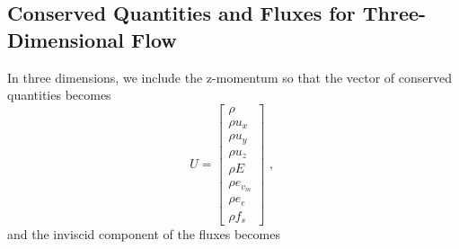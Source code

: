 \subsection{Conserved Quantities and Fluxes for Three-Dimensional Flow}
%
In three dimensions, we include the z-momentum so that the vector of conserved quantities becomes
\begin{equation}
 U = \left [ \begin{array}{c} \rho \\ 
                              \rho u_{x} \\ 
                              \rho u_{y} \\ 
                              \rho u_{z} \\ 
                              \rho E \\ 
                              \rho e_{v_{m}} \\ 
                              \rho e_{e} \\
                              \rho f_{s} 
             \end{array} \right ] \text{ , }
 \label{eq:U_vector_3D}
\end{equation}
and the inviscid component of the fluxes becomes

